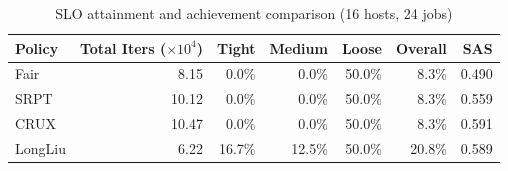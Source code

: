 \begin{table}[t]
\centering
\caption{SLO attainment and achievement comparison (16 hosts, 24 jobs)}
\label{tab:slo_16host}
\begin{tabular}{l|r|r|r|r|r|r}
\hline
Policy & Total Iters ($\times 10^4$) & Tight & Medium & Loose & Overall & SAS \\
\hline
Fair & 8.15 & 0.0\% & 0.0\% & 50.0\% & 8.3\% & 0.490 \\
SRPT & 10.12 & 0.0\% & 0.0\% & 50.0\% & 8.3\% & 0.559 \\
CRUX & 10.47 & 0.0\% & 0.0\% & 50.0\% & 8.3\% & 0.591 \\
LongLiu & 6.22 & 16.7\% & 12.5\% & 50.0\% & 20.8\% & 0.589 \\
\hline
\end{tabular}
\end{table}
